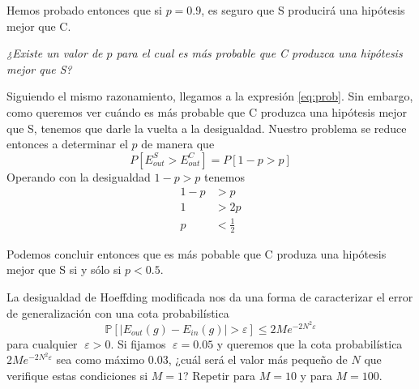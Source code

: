 \documentclass[a4paper, 11pt]{article}
\begin{document}
\begin{solucion}
        Hemos probado entonces que si $p = 0.9$, es seguro que S producirá una hipótesis mejor que C.

        \emph{¿Existe un valor de $p$ para el cual es más probable que C produzca una hipótesis mejor que S?}

        Siguiendo el mismo razonamiento, llegamos a la expresión \ref{eq:prob}. Sin embargo, como queremos ver cuándo es más probable que C produzca una hipótesis mejor que S, tenemos que darle la vuelta a la desigualdad. Nuestro problema se reduce entonces a determinar el $p$ de manera que
        \[
        P[E_{out}^S > E_{out}^C] = P[1-p > p]
        \]
        Operando con la desigualdad $1-p > p$ tenemos
        \begin{align*}
            1 - p &> p \\
            1  &> 2p \\
            p &< \frac{1}{2}
        \end{align*}

        Podemos concluir entonces que es más pobable que C produza una hipótesis mejor que S si y sólo si $p < 0.5$.
    \end{solucion}


    \begin{ejercicio}
        La desigualdad de Hoeffding modificada nos da una forma de caracterizar el error de generalización con una cota probabilística
        \[
        \mathbb{P}[\vert E_{out}(g) - E_{in}(g) \vert > \varepsilon] \leq 2 M e^{-2 N^2 \varepsilon}
        \]
        para cualquier $\varepsilon > 0$. Si fijamos $\varepsilon = 0.05$ y queremos que la cota probabilística $2 M e^{-2 N^2 \varepsilon}$ sea como máximo $0.03$, ¿cuál será el valor más pequeño de $N$ que verifique estas condiciones si $M = 1$? Repetir para $M = 10$ y para $M = 100$.
    \end{ejercicio}
\end{document}
